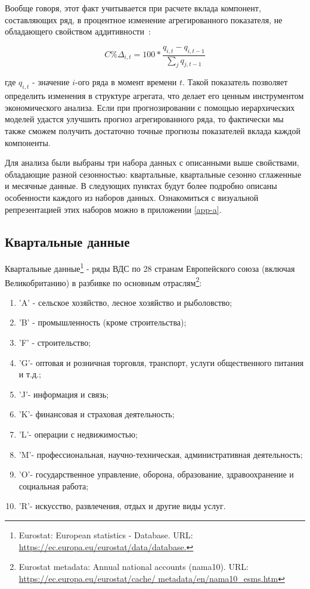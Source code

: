 \documentclass[12pt,a4paper, oneside]{extreport}
\begin{document}
Вообще говоря, этот  факт учитывается при расчете вклада компонент, составляющих ряд, в процентное изменение агрегированного показателя, не обладающего свойством аддитивности~:  

\begin{equation}\label{key}
 C\% Δ_{i,t} = 100 * \dfrac{q_{i,t}-q_{i,t-1} }{\sum_j q_{j,t-1} } 
\end{equation}

где $q_{i,t}$ - значение $i$-ого ряда в момент времени $t$.
Такой показатель позволяет определить изменения в структуре агрегата, что делает его ценным инструментом экономического анализа.
Если при прогнозировании с помощью иерархических моделей удастся улучшить прогноз агрегированного ряда, то фактически мы также сможем получить достаточно точные прогнозы показателей вклада каждой компоненты.

Для анализа были выбраны три набора данных с описанными выше свойствами, обладающие  разной сезонностью:  квартальные, квартальные сезонно сглаженные и месячные данные. В следующих пунктах будут более подробно   описаны особенности каждого из наборов данных. Ознакомиться с визуальной репрезентацией этих наборов можно в приложении \ref{app-a}.


\subsection{Квартальные данные}

Квартальные данные\footnote{Eurostat: European statistics - Database. URL: \url{https://ec.europa.eu/eurostat/data/database.}} - ряды ВДС по 28 странам Европейского союза (включая Великобританию) в разбивке по основным отраслям\footnote{Eurostat metadata: Annual national accounts (nama10). URL: \url{https://ec.europa.eu/eurostat/cache/
	metadata/en/nama10\_esms.htm}}:

\begin{enumerate}
	\item  'A' - сельское хозяйство, лесное хозяйство и рыболовство;
\item  'B' - промышленность (кроме строительства);
\item  'F' - строительство;
\item  'G'- оптовая и розничная торговля, транспорт, услуги общественного питания и т.д.;
\item  'J'- информация и связь;
\item  'K'- финансовая и страховая деятельность;
\item  'L'- операции с недвижимостью;
\item  'M'- профессиональная, научно-техническая, административная деятельность;
\item  'O'- государственное управление, оборона, образование, здравоохранение и социальная работа;
\item  'R'- искусство, развлечения, отдых и другие виды услуг. 


\end{enumerate}
\end{document}
